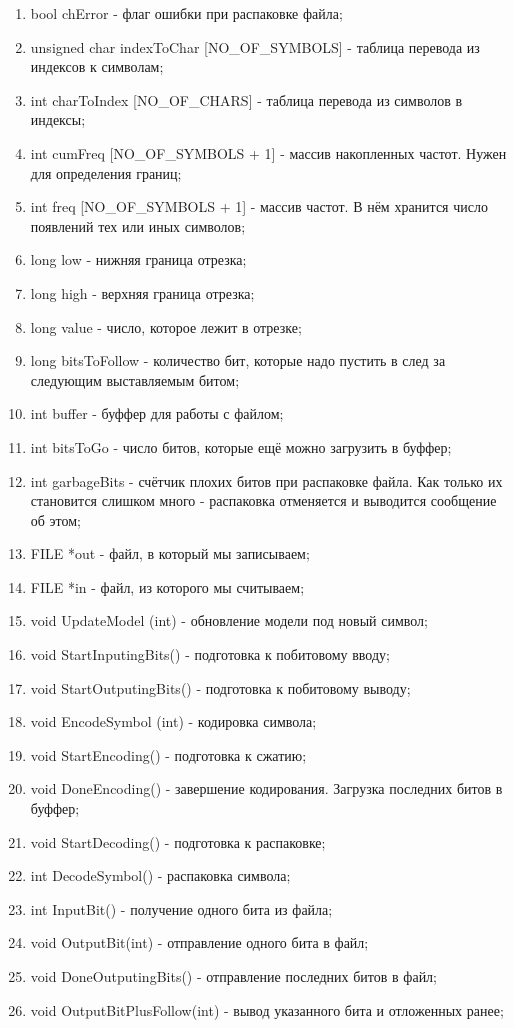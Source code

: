 \documentclass[12pt]{article}
\begin{document}
	\begin{enumerate}
		\item bool chError - флаг ошибки при распаковке файла;
		\item unsigned char indexToChar [NO\_OF\_SYMBOLS] - таблица перевода из индексов к символам;
		\item int charToIndex [NO\_OF\_CHARS] - таблица перевода из символов в индексы;
		\item int cumFreq [NO\_OF\_SYMBOLS + 1] - массив накопленных частот. Нужен для определения границ;
		\item int freq [NO\_OF\_SYMBOLS + 1] - массив частот. В нём хранится число появлений тех или иных символов;
		\item long low - нижняя граница отрезка; 
		\item long high - верхняя граница отрезка;
		\item long value - число, которое лежит в отрезке;
		\item long bitsToFollow - количество бит, которые надо пустить в след за следующим выставляемым битом;
		\item int buffer - буффер для работы с файлом;
		\item int bitsToGo - число битов, которые ещё можно загрузить в буффер;
		\item int garbageBits - счётчик плохих битов при распаковке файла. Как только их становится слишком много - распаковка отменяется и выводится сообщение об этом;
		\item FILE *out - файл, в который мы записываем;
		\item FILE *in - файл, из которого мы считываем;
		\item void UpdateModel (int) - обновление модели под новый символ;
		\item void StartInputingBits() - подготовка к побитовому вводу;
		\item void StartOutputingBits() - подготовка к побитовому выводу;
		\item void EncodeSymbol (int) - кодировка символа;
		\item void StartEncoding() - подготовка к сжатию;
		\item void DoneEncoding() - завершение кодирования. Загрузка последних битов в буффер;
		\item void StartDecoding() - подготовка к распаковке;
		\item int DecodeSymbol() - распаковка символа;
		\item int InputBit() - получение одного бита из файла;
		\item void OutputBit(int) - отправление одного бита в файл;
		\item void DoneOutputingBits() - отправление последних битов в файл;
		\item void OutputBitPlusFollow(int) - вывод указанного бита и отложенных ранее;
	\end{enumerate}
	
\end{document}
